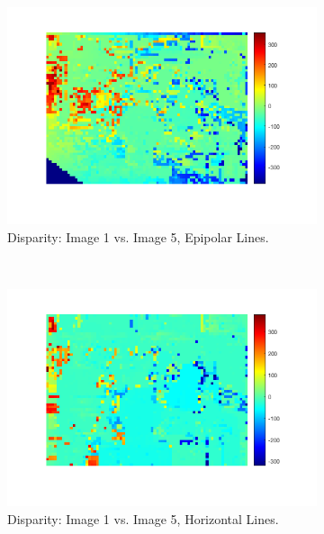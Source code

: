 \documentclass[a4paper, 10pt, conference]{ieeeconf}
\begin{document}
\begin{figure}[!ht]
  \captionsetup[subfigure]{position=b}
  \centering
    \begin{subfigure}{0.45\linewidth}
        \includegraphics[width=\linewidth]{pic/q2_2_c1_dis}
      \caption{Disparity: Image 1  vs. Image 5, Epipolar Lines.}
    \end{subfigure}
    ~
    \begin{subfigure}{0.45\linewidth}
        \includegraphics[width=\linewidth]{pic/q2_2_c2_dis}
        \caption{Disparity: Image 1  vs. Image 5, Horizontal Lines.}
    \end{subfigure}
    \\
    \begin{subfigure}{0.45\linewidth}

\end{subfigure}
\end{figure}
\end{document}
